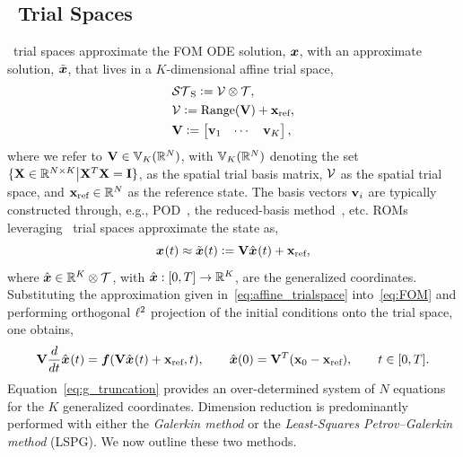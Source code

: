 \documentclass[3p,computermodern,10pt]{elsarticle}
\begin{document}
\subsection{\spatialAcronym\ Trial Spaces}
\spatialAcronym\ trial spaces approximate the FOM ODE solution, ${\boldsymbol x}$, with an approximate solution, $\tilde{\boldsymbol x}$, that lives in a $K$-dimensional affine trial space, 
\begin{align}\label{eq:spatial_subspace}
& \mathcal{ ST }_{\text{S}} \vcentcolon= \mathcal{V } \otimes \mathcal{T},\\ 
& \mathcal{V } \vcentcolon= \text{Range}(\mathbf {V}) +  \mathbf{x}_\text{ref},  \label{eq:spatial_subspace2}  \\
&\mathbf {V} \vcentcolon= \begin{bmatrix}  \mathbf{v}_1  & \cdots &  \mathbf{v}_K \end{bmatrix}, \label{eq:spatial_subspace3} 
\end{align}
where we refer to $\mathbf {V} \in \mathbb{V}_{K}(\mathbb{R}^{N})$, with $\mathbb{V}_{K}(\mathbb{R}^{N})$ denoting the set  $\{ \mathbf{X} \in \mathbb{R}^{N \times K} \big| \mathbf{X}^T \mathbf{X} = \mathbf{I} \}$, as the spatial trial basis matrix, $\mathcal{V }$ as the spatial trial space, and $\mathbf{x}_\text{ref} \in \mathbb{R}^{N}$ as the reference state. 
The basis vectors $\mathbf{v}_i$ are typically constructed through, e.g., POD~\cite{berkooz_turbulence_pod}, the reduced-basis method~\cite{rb_1,rb_2,rb_3,NgocCuong2005,Rozza2008}, etc. 
ROMs leveraging \spatialAcronym\ trial spaces approximate the state as,
\begin{equation}\label{eq:affine_trialspace}
{\boldsymbol x}^{}(t) \approx \tilde{\boldsymbol x}(t) \vcentcolon= \mathbf {V} \hat{ \boldsymbol x}^{}(t) + \mathbf{x}_\text{ref},
\end{equation}
where $\hat{ \boldsymbol x} \in \mathbb{R}^{K} \otimes \mathcal{T}$, with $\hat{ \boldsymbol x} : [0,T] \rightarrow \mathbb{R}^{K}$, are the generalized coordinates. Substituting the approximation given in~\eqref{eq:affine_trialspace} into~\eqref{eq:FOM} and performing orthogonal $\ell^2$ projection of the initial conditions onto the trial space, one obtains,
\begin{equation}\label{eq:g_truncation}
\mathbf {V} \frac{d }{dt}\hat{ \boldsymbol x}^{}(t) = \boldsymbol f(\mathbf {V}
\hat{ \boldsymbol x}^{}(t) + \mathbf{x}_\text{ref},t ), \qquad \hat{ \boldsymbol x}(0) = \mathbf {V}^T( {{\mathbf{x}}_0} - \mathbf{x}_\text{ref}), \qquad t \in [0,T].
\end{equation}
Equation~\eqref{eq:g_truncation} provides an over-determined system of $N$ equations for the $K$ generalized coordinates. Dimension reduction is predominantly performed with either the \textit{Galerkin method} or the \textit{Least-Squares Petrov--Galerkin method} (LSPG). We now outline these two methods.
\end{document}
